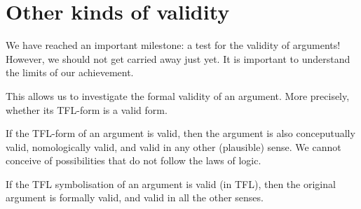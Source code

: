 %

\section{Other kinds of validity}

We have reached an important milestone: a test for the validity of arguments! However, we should not get carried away just yet. It is important to understand the {limits} of our achievement.

This allows us to investigate the formal validity of an argument. More precisely, whether its TFL-form is a valid form.

If the TFL-form of an argument is valid, then the argument is also conceputually valid, nomologically valid, and valid in any other (plausible) sense. We cannot conceive of possibilities that do not follow the laws of logic.

\begin{highlighted}
If the TFL symbolisation of an argument is valid (in TFL), then the original argument is formally valid, and valid in all the other senses.
\end{highlighted}

